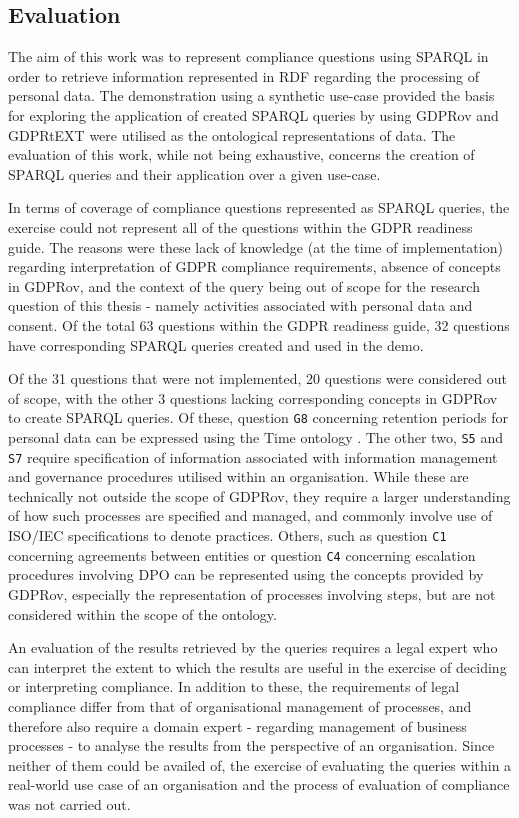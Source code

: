 \subsection{Evaluation}\label{sec:testing:sparql:evaluation}
The aim of this work was to represent compliance questions using SPARQL in order to retrieve information represented in RDF regarding the processing of personal data.
The demonstration using a synthetic use-case provided the basis for exploring the application of created SPARQL queries by using GDPRov and GDPRtEXT were utilised as the ontological representations of data.
The evaluation of this work, while not being exhaustive, concerns the creation of SPARQL queries and their application over a given use-case.

In terms of coverage of compliance questions represented as SPARQL queries, the exercise could not represent all of the questions within the GDPR readiness guide. The reasons were these lack of knowledge (at the time of implementation) regarding interpretation of GDPR compliance requirements, absence of concepts in GDPRov, and the context of the query being out of scope for the research question of this thesis - namely activities associated with personal data and consent.
Of the total 63 questions within the GDPR readiness guide, 32 questions have corresponding SPARQL queries created and used in the demo.

Of the 31 questions that were not implemented, 20 questions were considered out of scope, with the other 3 questions lacking corresponding concepts in GDPRov to create SPARQL queries.
Of these, question \texttt{G8} concerning retention periods for personal data can be expressed using the Time ontology \cite{cox_time_2017}.
The other two, \texttt{S5} and \texttt{S7} require specification of information associated with information management and governance procedures utilised within an organisation. While these are technically not outside the scope of GDPRov, they require a larger understanding of how such processes are specified and managed, and commonly involve use of ISO/IEC specifications to denote practices.
Others, such as question \texttt{C1} concerning agreements between entities or question \texttt{C4} concerning escalation procedures involving DPO can be represented using the concepts provided by GDPRov, especially the representation of processes involving steps, but are not considered within the scope of the ontology.

An evaluation of the results retrieved by the queries requires a legal expert who can interpret the extent to which the results are useful in the exercise of deciding or interpreting compliance.
In addition to these, the requirements of legal compliance differ from that of organisational management of processes, and therefore also require a domain expert - regarding management of business processes - to analyse the results from the perspective of an organisation.
Since neither of them could be availed of, the exercise of evaluating the queries within a real-world use case of an organisation and the process of evaluation of compliance was not carried out.


